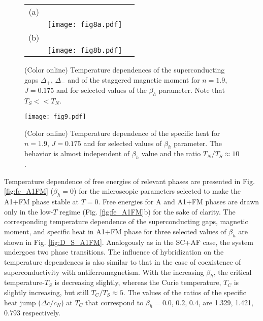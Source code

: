 \documentclass[aps,prb,showpacs,reprint]{revtex4-1}
\begin{document}
\begin{figure}[htpb]
\centering
\begin{tabular}{ccc}
  (a) & & \quad \quad \quad \quad \quad\\
      & \texttt{[image: fig8a.pdf]} & \\
  (b) & & \quad \quad \quad \quad \quad\\
      & \texttt{[image: fig8b.pdf]} &\\
\end{tabular}
\caption{(Color online) Temperature dependences of the superconducting gaps
$\Delta_+$,
$\Delta_-$ and of the staggered magnetic moment for $n=1.9$, $J=0.175$ and for
selected values of the $\beta_h$ parameter. Note that $T_S<<T_N$.}
\label{fig:D_S_SCAF}
\end{figure}


\begin{figure}[htpb]
\texttt{[image: fig9.pdf]} 
\caption{(Color online) Temperature dependence of the specific heat for $n=1.9$,
$J=0.175$ and for
selected values of $\beta_h$
parameter. The behavior is almost independent of $\beta_h$ value and the ratio
$T_N/T_S \approx 10$.}
\label{fig:c_SCAF}
\end{figure}

Temperature dependence of free energies of relevant
phases are presented in Fig. \ref{fig:fe_A1FM} ($\beta_h=0$) for the
microscopic parameters selected to make the A1+FM phase stable at $T=0$.
Free energies for A and A1+FM phases are drawn only in the low-$T$ regime (Fig.
\ref{fig:fe_A1FM}b) for the sake of clarity.
The corresponding temperature dependence
of the superconducting gaps, magnetic moment, and specific heat in A1+FM phase for three
selected values of $\beta_h$ are
shown in Fig. \ref{fig:D_S_A1FM}. Analogously as in the SC+AF case, the
system
undergoes two
phase transitions. The
influence of hybridization on the temperature dependences is also similar to
that in the
case of
coexistence of superconductivity with antiferromagnetism. With the
increasing $\beta_h$, the critical temperature-$T_S$ is
decreasing slightly, whereas the Curie temperature, $T_C$ is slightly
increasing, but still $T_C/T_S\approx 5$. The values of the ratios of the
specific heat jump ($\Delta c/c_N$) at $T_C$ that correspond to $\beta_h=0.0$,
$0.2$, $0.4$, are 1.329, 1.421, 0.793 respectively. 
\end{document}
